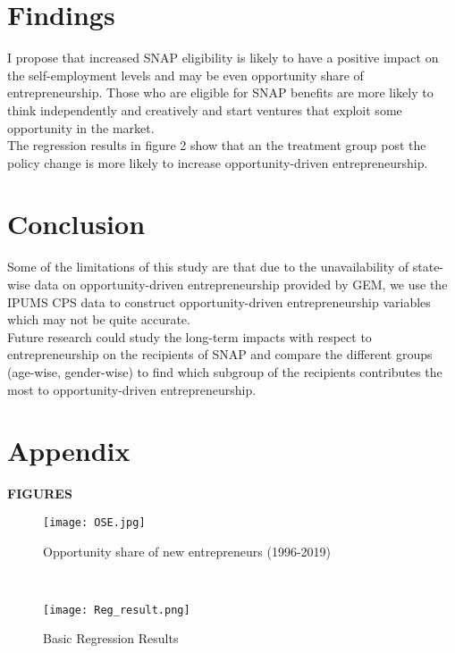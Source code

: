 \documentclass[12pt]{article}
\begin{document}
\begin{titlingpage}
\section*{Findings} 

I propose that increased SNAP eligibility is likely to have a positive impact on the self-employment levels and may be even opportunity share of entrepreneurship. Those who are eligible for SNAP benefits are more likely to think independently and creatively and start ventures that exploit some opportunity in the market. \\

The regression results in figure 2 show that an the treatment group post the policy change is more likely to increase opportunity-driven entrepreneurship. \\



\newpage
{}
\section*{Conclusion}

Some of the limitations of this study are that due to the unavailability of state-wise data on opportunity-driven entrepreneurship provided by GEM, we use the IPUMS CPS data to construct opportunity-driven entrepreneurship variables which may not be quite accurate. \\

Future research could study the long-term impacts with respect to entrepreneurship on the recipients of SNAP and compare the different groups (age-wise, gender-wise) to find which subgroup of the recipients contributes the most to opportunity-driven entrepreneurship. \\

\newpage
\section*{Appendix}

\textbf{FIGURES}
\begin{figure}[H]
    \centering
    \texttt{[image: OSE.jpg]}
    \caption{Opportunity share of new entrepreneurs (1996-2019)}
    \label{fig:ose}
\end{figure} \\


\begin{figure}[H]
    \centering
    \texttt{[image: Reg\_result.png]}
    \caption{Basic Regression Results}
    \label{fig:my_label}
\end{figure}




\end{titlingpage}
\end{document}
